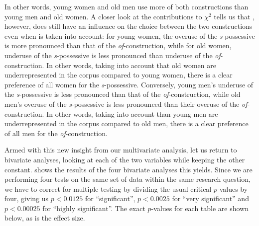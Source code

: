 In other words, young women and old men use more of both constructions than young men and old women. A closer look at the contributions to $\chi^2$  tells us that , however, does still have an influence on the choice between the two constructions even when  is taken into account: for young women, the overuse of the \textit{s}-possessive  is more pronounced than that of the \textit{of}-construction, while for old women, underuse of the \textit{s}-possessive is less pronounced than underuse of the \textit{of}-construction. In other words, taking into account that old women are underrepresented  in the corpus compared to young women, there is a clear preference of all women for the \textit{s}-possessive. Conversely, young men's underuse of the \textit{s}-possessive is less pronounced than that of the \textit{of}-construction, while old men's overuse of the \textit{s}-possessive  is less pronounced than their overuse of the \textit{of}-construction. In other words, taking into account than young men are underrepresented in the corpus compared to old men, there is a clear preference of all men for the \textit{of}-construction.

Armed with this new insight from our multivariate  analysis, let us return to bivariate  analyses, looking at each of the two variables while keeping the other constant.  shows the results of the four bivariate analyses this yields. Since we are performing four tests on the same set of data within the same research question, we have to correct for multiple testing by dividing the usual critical $p$\hyp{}values  by four, giving us $p < 0.0125$ for ``significant'', $p < 0.0025$ for ``very significant'' and $p < 0.00025$ for ``highly significant''. The exact $p$\hyp{}values for each table are shown below, as is the effect  size.


